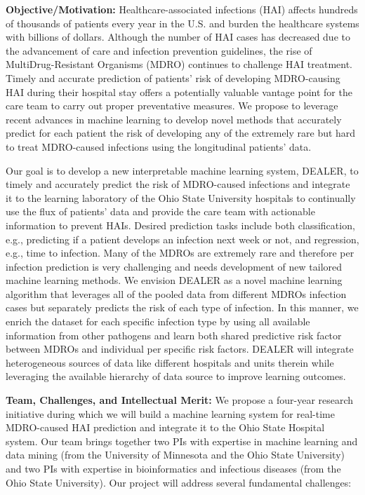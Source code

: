 {\bf Objective/Motivation:} Healthcare-associated infections (HAI) affects hundreds of thousands of patients every year in the U.S. and burden the healthcare systems with billions of dollars. Although the number of HAI cases has decreased due to the advancement of care and infection prevention guidelines, the rise of MultiDrug-Resistant Organisms (MDRO) continues to challenge HAI treatment. Timely and accurate prediction of patients' risk of developing MDRO-causing HAI during their hospital stay offers a potentially valuable vantage point for the care team to carry out proper preventative measures. We propose to leverage recent advances in machine learning to develop novel methods that accurately predict for each patient the risk of developing any of the extremely rare but hard to treat MDRO-caused infections using the longitudinal patients' data.%

Our goal is to develop a new interpretable machine learning system, DEALER, to timely and accurately predict the risk of MDRO-caused infections and integrate it to the learning laboratory of the Ohio State University hospitals to continually use the flux of patients' data and provide the care team with actionable information to prevent HAIs. Desired prediction tasks include both classification, e.g., predicting if a patient develops an infection next week or not, and regression, e.g., time to infection. Many of the MDROs are extremely rare and therefore per infection prediction is very challenging and needs development of new tailored machine learning methods. We envision DEALER as a novel machine learning algorithm that leverages all of the pooled data from different MDROs infection cases but separately predicts the risk of each type of infection. In this manner, we enrich the dataset for each specific infection type by using all available information from other pathogens and learn both shared predictive risk factor between MDROs and individual per specific risk factors. DEALER will integrate heterogeneous sources of data like different hospitals and units therein while leveraging the available hierarchy of data source to improve learning outcomes.

{\bf Team, Challenges, and Intellectual Merit:} We propose a four-year research initiative during which we will build a machine learning system for real-time MDRO-caused HAI prediction and integrate it to the Ohio State Hospital system. Our team brings together two PIs with expertise in machine learning and data mining (from the University of Minnesota and the Ohio State University) and two PIs with expertise in bioinformatics and infectious diseases (from the Ohio State University). Our project will address several fundamental challenges:

